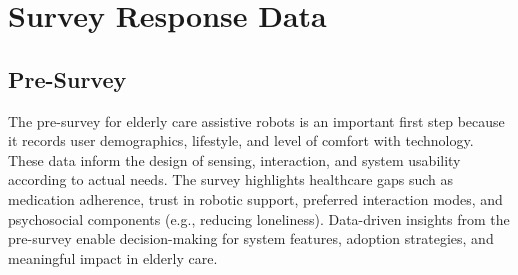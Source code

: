 \section{ Survey Response Data}

\subsection{Pre-Survey}
The pre-survey for elderly care assistive robots is an important first step because it records user demographics, lifestyle, and level of comfort with technology. These data inform the design of sensing, interaction, and system usability according to actual needs. The survey highlights healthcare gaps such as medication adherence, trust in robotic support, preferred interaction modes, and psychosocial components (e.g., reducing loneliness). Data-driven insights from the pre-survey enable decision-making for system features, adoption strategies, and meaningful impact in elderly care.

